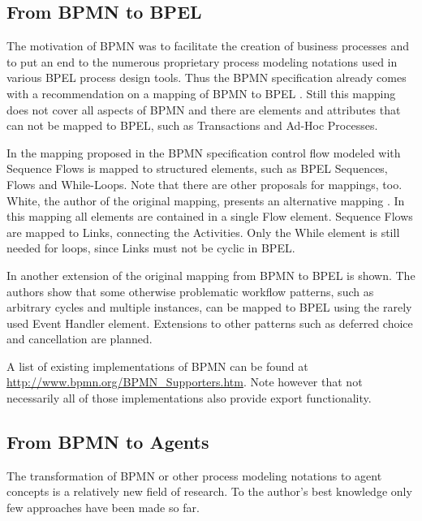 \subsection{From BPMN to BPEL}

The motivation of BPMN was to facilitate the creation of business processes and to put an end to the numerous proprietary process modeling notations used in various BPEL process design tools. Thus the BPMN specification already comes with a recommendation on a mapping of BPMN to BPEL \cite[Chapter 11]{spec_bpmn}. Still this mapping does not cover all aspects of BPMN and there are elements and attributes that can not be mapped to BPEL, such as Transactions and Ad-Hoc Processes.

In the mapping proposed in the BPMN specification control flow modeled with Sequence Flows is mapped to structured elements, such as BPEL Sequences, Flows and While-Loops. Note that there are other proposals for mappings, too. White, the author of the original mapping, presents an alternative mapping \cite{bpmnToModelBpel}. In this mapping all elements are contained in a single Flow element. Sequence Flows are mapped to Links, connecting the Activities. Only the While element is still needed for loops, since Links must not be cyclic in BPEL.

In \cite{trafoStdProcMod2BPEL} another extension of the original mapping from BPMN to BPEL is shown. The authors show that some otherwise problematic workflow patterns, such as arbitrary cycles and multiple instances, can be mapped to BPEL using the rarely used Event Handler element. Extensions to other patterns such as deferred choice and cancellation are planned.

A list of existing implementations of BPMN can be found at \url{http://www.bpmn.org/BPMN_Supporters.htm}. Note however that not necessarily all of those implementations also provide export functionality.


\subsection{From BPMN to Agents}


The transformation of BPMN or other process modeling notations to agent concepts is a relatively new field of research. To the author's best knowledge only few approaches have been made so far.

